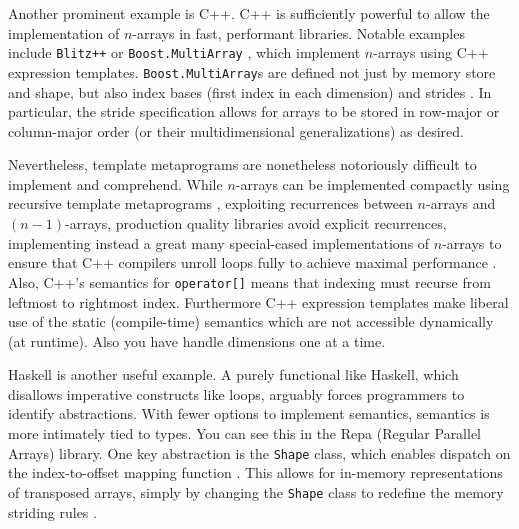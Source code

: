 \documentclass[preprint]{sigplanconf}
\newcommand{\code}[1]{\texttt{#1}}
\begin{document}
\begin{enumerate}
Another prominent example is C++. C++ is sufficiently powerful to allow the
implementation of $n$-arrays in fast, performant libraries. Notable examples
include \code{Blitz++} \cite{Veldhuizen:1998ab} or \code{Boost.MultiArray}
\cite{Garcia:2005ma}, which implement $n$-arrays using C++ expression
templates. \code{Boost.MultiArray}s are defined not just by memory store and
shape, but also index bases (first index in each dimension) and strides
\cite{Garcia:2005ma}. In particular, the stride specification allows for
arrays to be stored in row-major or column-major order (or their
multidimensional generalizations) as desired.

Nevertheless, template metaprograms are nonetheless notoriously difficult to
implement and comprehend. While $n$-arrays can be implemented compactly using
recursive template metaprograms \cite{Bavestrelli:2000ct}, exploiting
recurrences between $n$-arrays and $(n-1)$-arrays, production quality
libraries avoid explicit recurrences, implementing instead a great many
special-cased implementations of $n$-arrays to ensure that C++ compilers
unroll loops fully to achieve maximal performance \cite{Garcia:2005ma}. Also,
C++'s semantics for \code{operator[]} means that indexing must recurse from
leftmost to rightmost index. Furthermore C++ expression templates make liberal
use of the static (compile-time) semantics which are not accessible
dynamically (at runtime). Also you have handle dimensions one at a time.




Haskell is another useful example. A purely functional like Haskell, which
disallows imperative constructs like loops, arguably forces programmers to
identify abstractions. With fewer options to implement semantics, semantics is
more intimately tied to types. You can see this in the Repa (Regular Parallel
Arrays) library. One key abstraction is the \code{Shape} class, which enables
dispatch on the index-to-offset mapping function \cite{Keller:2010rs}. This
allows for in-memory representations of transposed arrays, simply by changing
the \code{Shape} class to redefine the memory striding rules
\cite{Keller:2010rs}.


\end{enumerate}
\end{document}
